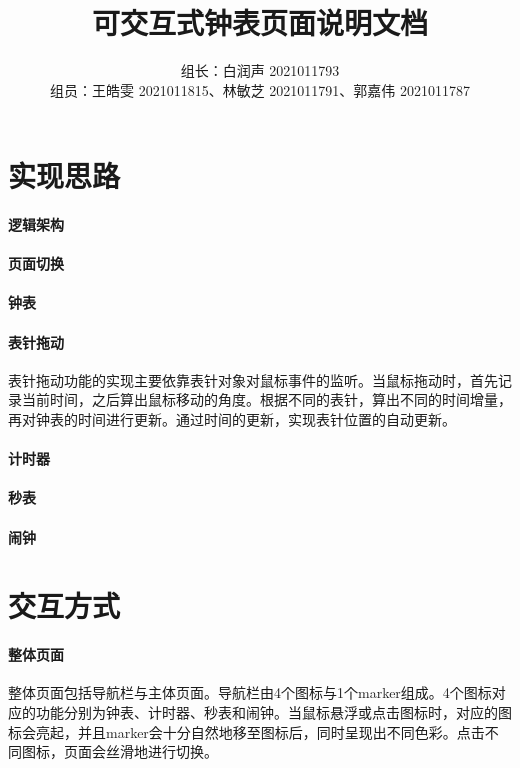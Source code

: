\documentclass[UTF8]{ctexart}
\title{可交互式钟表页面说明文档}
\author{组长：白润声 2021011793 \\ 组员：王皓雯 2021011815、林敏芝 2021011791、郭嘉伟 2021011787}
\date{}
\begin{document}
	\maketitle
	\section{实现思路} %
	\paragraph{逻辑架构}
	
	\paragraph{页面切换}
	
	\paragraph{钟表}
	
	\paragraph{表针拖动}
		表针拖动功能的实现主要依靠表针对象对鼠标事件的监听。当鼠标拖动时，首先记录当前时间，之后算出鼠标移动的角度。根据不同的表针，算出不同的时间增量，再对钟表的时间进行更新。通过时间的更新，实现表针位置的自动更新。
	\paragraph{计时器}
	
	\paragraph{秒表}
	
	\paragraph{闹钟}
	
	
	\section{交互方式} %
	\paragraph{整体页面}
		整体页面包括导航栏与主体页面。导航栏由4个图标与1个marker组成。4个图标对应的功能分别为钟表、计时器、秒表和闹钟。当鼠标悬浮或点击图标时，对应的图标会亮起，并且marker会十分自然地移至图标后，同时呈现出不同色彩。点击不同图标，页面会丝滑地进行切换。
\end{document}
